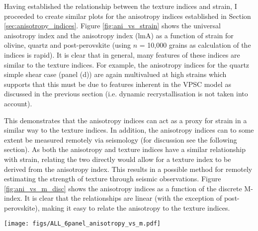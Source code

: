 \documentclass[a4paper,12pt,twoside]{report}
\numberwithin{equation}{chapter}
\begin{document}
Having established the relationship between the texture indices and strain, I proceeded to create similar plots for the anisotropy indices established in Section \ref{sec:anisotropy_indices}. Figure \ref{fig:ani_vs_strain} shows the universal anisotropy index \citep[uA,][]{Ranganathan2008} and the \cite{Ledbetter2006} anisotropy index (lmA) as a function of strain for olivine, quartz and post-perovskite (using $n$ = 10,000 grains as calculation of the indices is rapid). It is clear that in general, many features of these indices are similar to the texture indices. For example, the anisotropy indices for the quartz simple shear case (panel (d)) are again multivalued at high strains which supports that this must be due to features inherent in the VPSC model as discussed in the previous section (i.e. dynamic recrystallisation is not taken into account).    

This demonstrates that the anisotropy indices can act as a proxy for strain in a similar way to the texture indices. In addition, the anisotropy indices can to some extent be measured remotely via seismology (for discussion see the following section). As both the anisotropy and texture indices have a similar relationship with strain, relating the two directly would allow for a texture index to be derived from the anisotropy index. This results in a possible method for remotely estimating the strength of texture through seismic observations. Figure \ref{fig:ani_vs_m_disc} shows the anisotropy indices as a function of the discrete M-index. It is clear that the relationships are linear (with the exception of post-perovskite), making it easy to relate the anisotropy to the texture indices. 

\begin{figure*}[p]
  \centering
    \texttt{[image: figs/ALL\_6panel\_anisotropy\_vs\_m.pdf]}
  \caption[Relationship of anisotropy indices and M-index (disc)]{Seismic anisotropy measures, the Universal Elastic Anisotropy Index (uA) and the \cite{Ledbetter2006} index (lmA) as a function of the discrete M-index. \textbf{Top row} shows data from olivine VPSC models, \textbf{middle row} shows quartz, and \textbf{bottom row} shows post-perovskite. \textbf{Right column} shows data from axial compression models and \textbf{left column} shows data from simple shear models. All calculations use $n$ = 10,000 grains.} 
  \label{fig:ani_vs_m_disc}
\end{figure*} 
 
\end{document}
